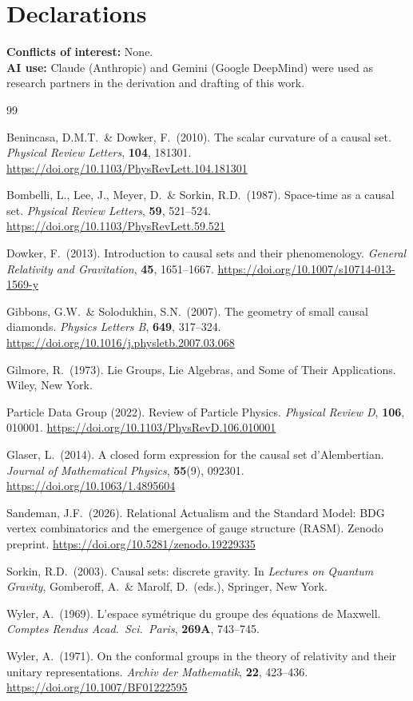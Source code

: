 \documentclass[12pt,a4paper]{article}
\theoremstyle{definition}
\begin{document}
\section*{Declarations}
\textbf{Conflicts of interest:} None.\\
\textbf{AI use:} Claude (Anthropic) and Gemini (Google DeepMind) were
used as research partners in the derivation and drafting of this work.


\begin{thebibliography}{99}

Benincasa, D.M.T.\ \& Dowker, F.\ (2010).
The scalar curvature of a causal set.
\textit{Physical Review Letters}, \textbf{104}, 181301.
\url{https://doi.org/10.1103/PhysRevLett.104.181301}

Bombelli, L., Lee, J., Meyer, D.\ \& Sorkin, R.D.\ (1987).
Space-time as a causal set.
\textit{Physical Review Letters}, \textbf{59}, 521--524.
\url{https://doi.org/10.1103/PhysRevLett.59.521}

Dowker, F.\ (2013).
Introduction to causal sets and their phenomenology.
\textit{General Relativity and Gravitation}, \textbf{45}, 1651--1667.
\url{https://doi.org/10.1007/s10714-013-1569-y}

Gibbons, G.W.\ \& Solodukhin, S.N.\ (2007).
The geometry of small causal diamonds.
\textit{Physics Letters B}, \textbf{649}, 317--324.
\url{https://doi.org/10.1016/j.physletb.2007.03.068}

Gilmore, R.\ (1973).
Lie Groups, Lie Algebras, and Some of Their Applications.
Wiley, New York.

Particle Data Group (2022).
Review of Particle Physics.
\textit{Physical Review D}, \textbf{106}, 010001.
\url{https://doi.org/10.1103/PhysRevD.106.010001}

Glaser, L.\ (2014).
A closed form expression for the causal set d'Alembertian.
\textit{Journal of Mathematical Physics}, \textbf{55}(9), 092301.
\url{https://doi.org/10.1063/1.4895604}

Sandeman, J.F.\ (2026).
Relational Actualism and the Standard Model:
BDG vertex combinatorics and the emergence of gauge structure (RASM).
Zenodo preprint.
\url{https://doi.org/10.5281/zenodo.19229335}

Sorkin, R.D.\ (2003).
Causal sets: discrete gravity.
In \textit{Lectures on Quantum Gravity}, Gomberoff, A.\ \& Marolf, D.\ (eds.),
Springer, New York.

Wyler, A.\ (1969).
L'espace sym\'{e}trique du groupe des \'{e}quations de Maxwell.
\textit{Comptes Rendus Acad.\ Sci.\ Paris}, \textbf{269A}, 743--745.

Wyler, A.\ (1971).
On the conformal groups in the theory of relativity and their unitary
representations.
\textit{Archiv der Mathematik}, \textbf{22}, 423--436.
\url{https://doi.org/10.1007/BF01222595}

\end{thebibliography}
\end{document}
